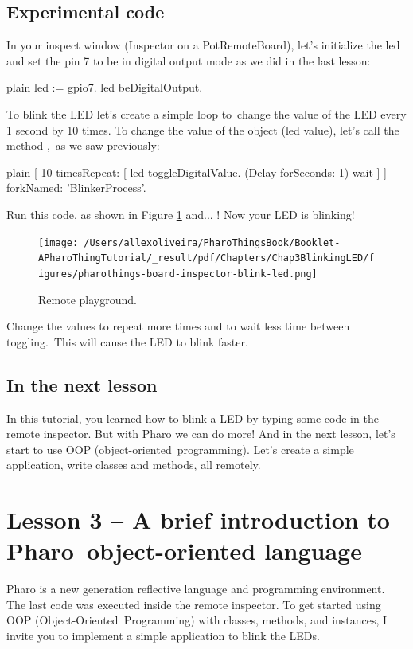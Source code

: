 \documentclass[10pt,twoside,english]{_support/latex/sbabook/sbabook}
\begin{document}
\section{Experimental code}
In your inspect window (Inspector on a PotRemoteBoard), let's initialize the led and set the pin 7 to be in digital output mode as we did in the last lesson:

\begin{displaycode}{plain}
led := gpio7.
led beDigitalOutput.
\end{displaycode}

To blink the LED let's create a simple loop to change the value of the LED every 1 second by 10 times. To change the value of the object (led value), let's call the method , as we saw previously:

\begin{displaycode}{plain}
[ 10 timesRepeat: [
	led toggleDigitalValue.
 	(Delay forSeconds: 1) wait
] ] forkNamed: 'BlinkerProcess'.
\end{displaycode}

Run this code, as shown in Figure \ref{RemoteInspector} and... ! Now your LED is blinking!


\begin{figure}

\begin{center}
\texttt{[image: /Users/allexoliveira/PharoThingsBook/Booklet-APharoThingTutorial/\_result/pdf/Chapters/Chap3BlinkingLED/figures/pharothings-board-inspector-blink-led.png]}\caption{Remote playground.\label{RemoteInspector}}\end{center}
\end{figure}


Change the values to repeat more times and to wait less time between toggling. This will cause the LED to blink faster.
\section{In the next lesson}
In this tutorial, you learned how to blink a LED by typing some code in the remote inspector. But with Pharo we can do more! And in the next lesson, let’s start to use OOP (object-oriented programming). Let's create a simple application, write classes and methods, all remotely.
\chapter{Lesson 3 – A brief introduction to Pharo object-oriented language}
Pharo is a new generation reflective language and programming environment. The last code was executed inside the remote inspector. To get started using OOP (Object-Oriented Programming) with classes, methods, and instances, I invite you to implement a simple application to blink the LEDs.
\end{document}
